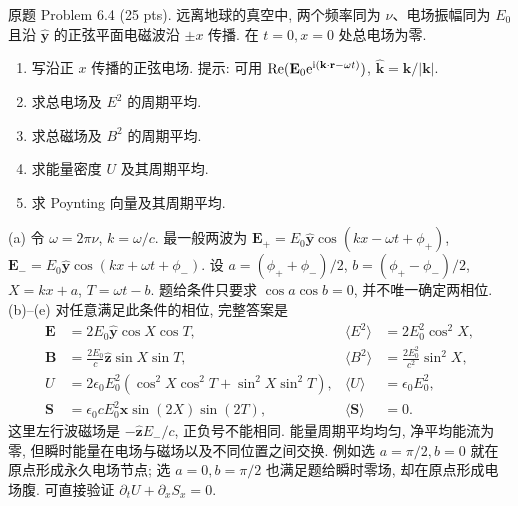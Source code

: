 \begin{exercise}\label{ps:6.4}
原题 Problem 6.4 (25 pts). 远离地球的真空中, 两个频率同为 $\nu$、电场振幅同为 $E_0$ 且沿 $\hat{\mathbf y}$ 的正弦平面电磁波沿 $\pm x$ 传播. 在 $t=0,x=0$ 处总电场为零.
\begin{enumerate}[label=\alph*.]
\item 写沿正 $x$ 传播的正弦电场. 提示: 可用 $\operatorname{Re}(\mathbf E_0\mathrm e^{\mathrm i(\mathbf k\cdot\mathbf r-\omega t)})$, $\hat{\mathbf k}=\mathbf k/|\mathbf k|$.
\item 求总电场及 $E^2$ 的周期平均.
\item 求总磁场及 $B^2$ 的周期平均.
\item 求能量密度 $U$ 及其周期平均.
\item 求 Poynting 向量及其周期平均.
\end{enumerate}
\end{exercise}
\begin{solution}
(a) 令 $\omega=2\pi\nu$, $k=\omega/c$. 最一般两波为
$\mathbf E_+=E_0\hat{\mathbf y}\cos(kx-\omega t+\phi_+)$,
$\mathbf E_-=E_0\hat{\mathbf y}\cos(kx+\omega t+\phi_-)$.
设 $a=(\phi_++\phi_-)/2$, $b=(\phi_+-\phi_-)/2$, $X=kx+a$, $T=\omega t-b$. 题给条件只要求 $\cos a\cos b=0$, 并不唯一确定两相位.
(b)--(e) 对任意满足此条件的相位, 完整答案是
\[
\begin{aligned}
\mathbf E&=2E_0\hat{\mathbf y}\cos X\cos T,
&\langle E^2\rangle&=2E_0^2\cos^2X,\\
\mathbf B&=\frac{2E_0}{c}\hat{\mathbf z}\sin X\sin T,
&\langle B^2\rangle&=\frac{2E_0^2}{c^2}\sin^2X,\\
U&=2\epsilon_0E_0^2(\cos^2X\cos^2T+\sin^2X\sin^2T),
&\langle U\rangle&=\epsilon_0E_0^2,\\
\mathbf S&=\epsilon_0cE_0^2\hat{\mathbf x}\sin(2X)\sin(2T),
&\langle\mathbf S\rangle&=0.
\end{aligned}
\]
这里左行波磁场是 $-\hat{\mathbf z}E_-/c$, 正负号不能相同. 能量周期平均均匀, 净平均能流为零, 但瞬时能量在电场与磁场以及不同位置之间交换. 例如选 $a=\pi/2,b=0$ 就在原点形成永久电场节点; 选 $a=0,b=\pi/2$ 也满足题给瞬时零场, 却在原点形成电场腹. 可直接验证 $\partial_tU+\partial_xS_x=0$.
\end{solution}


